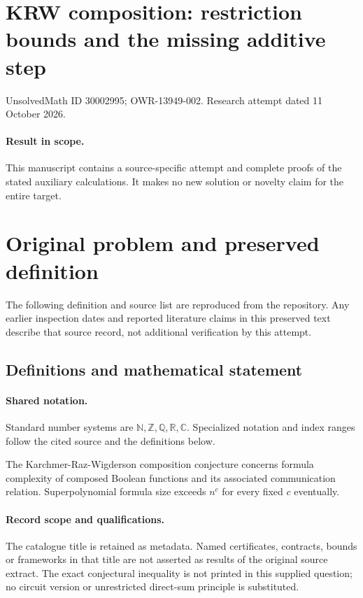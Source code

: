 \documentclass[11pt]{article}
\begin{document}
\section*{KRW composition: restriction bounds and the missing additive step}
\noindent UnsolvedMath ID 30002995; OWR-13949-002. Research attempt dated 11 October 2026.
\paragraph{Result in scope.}This manuscript contains a source-specific attempt and complete proofs of the stated auxiliary calculations. It makes no new solution or novelty claim for the entire target.
\section{Original problem and preserved definition}
The following definition and source list are reproduced from the repository. Any earlier inspection dates and reported literature claims in this preserved text describe that source record, not additional verification by this attempt.
\subsection{Definitions and mathematical statement}

\paragraph{Shared notation.}Standard number systems are $\mathbb N,\mathbb Z,\mathbb Q,\mathbb R,\mathbb C$. Specialized notation and index ranges follow the cited source and the definitions below.


The Karchmer-Raz-Wigderson composition conjecture concerns formula complexity of composed Boolean functions and its associated communication relation. Superpolynomial formula size exceeds $n^c$ for every fixed $c$ eventually.
\paragraph{Record scope and qualifications.}
The catalogue title is retained as metadata. Named certificates, contracts, bounds or frameworks in that title are not asserted as results of the original source extract.
The exact conjectural inequality is not printed in this supplied question; no circuit version or unrestricted direct-sum principle is substituted.
\end{document}

